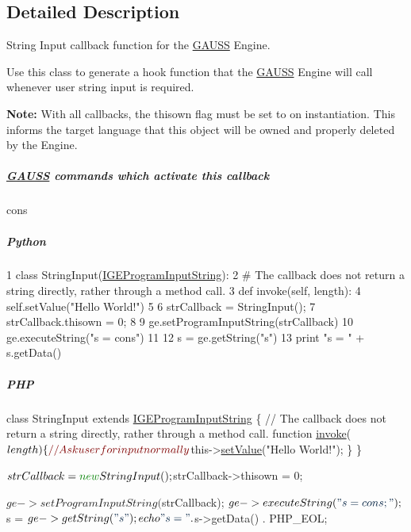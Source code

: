 \subsection{Detailed Description}
String Input callback function for the \hyperlink{class_g_a_u_s_s}{G\-A\-U\-S\-S} Engine. 

Use this class to generate a hook function that the \hyperlink{class_g_a_u_s_s}{G\-A\-U\-S\-S} Engine will call whenever user string input is required.

{\bfseries Note\-:} With all callbacks, the {\ttfamily thisown} flag must be set to {} on instantiation. This informs the target language that this object will be owned and properly deleted by the Engine.

\subparagraph*{\hyperlink{class_g_a_u_s_s}{G\-A\-U\-S\-S} commands which activate this callback}


\begin{DoxyItemize}
\item {\ttfamily cons}
\end{DoxyItemize}

\subparagraph*{Python}


\begin{DoxyCode}
1 \textcolor{keyword}{class }StringInput(\hyperlink{class_i_g_e_program_input_string}{IGEProgramInputString}):
2     \textcolor{comment}{# The callback does not return a string directly, rather through a method call.}
3     \textcolor{keyword}{def }invoke(self, length):
4         self.setValue(\textcolor{stringliteral}{"Hello World!"})
5 
6 strCallback = StringInput();
7 strCallback.thisown = 0;
8 
9 ge.setProgramInputString(strCallback)
10 ge.executeString(\textcolor{stringliteral}{"s = cons"})
11 
12 s = ge.getString(\textcolor{stringliteral}{"s"})
13 \textcolor{keywordflow}{print} \textcolor{stringliteral}{"s = "} + s.getData()
\end{DoxyCode}


\subparagraph*{P\-H\-P}


\begin{DoxyCode}
\textcolor{keyword}{class }StringInput \textcolor{keyword}{extends} \hyperlink{class_i_g_e_program_input_string}{IGEProgramInputString} \{
    \textcolor{comment}{// The callback does not return a string directly, rather through a method call.}
    \textcolor{keyword}{function} \hyperlink{class_i_g_e_program_input_string_aff170652d98f6a992a27134a7c674e01}{invoke}($length) \{
        \textcolor{comment}{// Ask user for input normally}
        $this->\hyperlink{class_i_g_e_program_input_string_ac692d94b650c29fe8d82690c78003be6}{setValue}(\textcolor{stringliteral}{"Hello World!"});
    \}
\}

$strCallback = \textcolor{keyword}{new} StringInput();
$strCallback->thisown = 0;

$ge->setProgramInputString($strCallback);
$ge->executeString(\textcolor{stringliteral}{"s = cons;"});

$s = $ge->getString(\textcolor{stringliteral}{"s"});
echo \textcolor{stringliteral}{"s = "} . $s->getData() . PHP\_EOL;
\end{DoxyCode}


